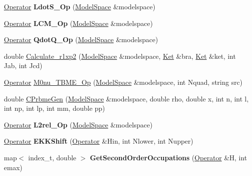 \begin{DoxyCompactItemize}
\item 
\mbox{\label{namespaceimsrg__util_a59effadf5bb5af39763fc2ba051d8f28}} 
\hyperlink{classOperator}{Operator} {\bfseries Ldot\+S\+\_\+\+Op} (\hyperlink{classModelSpace}{Model\+Space} \&modelspace)
\item 
\mbox{\label{namespaceimsrg__util_aa986d7b77ef7dc02fb620307bafc901c}} 
\hyperlink{classOperator}{Operator} {\bfseries L\+C\+M\+\_\+\+Op} (\hyperlink{classModelSpace}{Model\+Space} \&modelspace)
\item 
\mbox{\label{namespaceimsrg__util_a69a1c594ea2a97f14ffa971212f0e517}} 
\hyperlink{classOperator}{Operator} {\bfseries Qdot\+Q\+\_\+\+Op} (\hyperlink{classModelSpace}{Model\+Space} \&modelspace)
\item 
double \hyperlink{namespaceimsrg__util_aa28f0db9ecf5d7a27908cda9fa579a31}{Calculate\+\_\+r1xp2} (\hyperlink{classModelSpace}{Model\+Space} \&modelspace, \hyperlink{classKet}{Ket} \&bra, \hyperlink{classKet}{Ket} \&ket, int Jab, int Jcd)
\item 
\hyperlink{classOperator}{Operator} \hyperlink{namespaceimsrg__util_ab286571384270b07d5b002c8c6f6dca2}{M0nu\+\_\+\+T\+B\+M\+E\+\_\+\+Op} (\hyperlink{classModelSpace}{Model\+Space} \&modelspace, int Nquad, string src)
\item 
double \hyperlink{namespaceimsrg__util_a9e2f7d969020b57db388ecb464314ebb}{C\+Prbme\+Gen} (\hyperlink{classModelSpace}{Model\+Space} \&modelspace, double rho, double x, int n, int l, int np, int lp, int mm, double pp)
\item 
\mbox{\label{namespaceimsrg__util_a5e4f0da05037fbdbb7417248cbe3398e}} 
\hyperlink{classOperator}{Operator} {\bfseries L2rel\+\_\+\+Op} (\hyperlink{classModelSpace}{Model\+Space} \&modelspace)
\item 
\mbox{\label{namespaceimsrg__util_a51ea2e1b73104c29f16a7ad606c7cb24}} 
\hyperlink{classOperator}{Operator} {\bfseries E\+K\+K\+Shift} (\hyperlink{classOperator}{Operator} \&Hin, int Nlower, int Nupper)
\item 
\mbox{\label{namespaceimsrg__util_afd759ab1c852c361f391feb5f84479c9}} 
map$<$ index\+\_\+t, double $>$ {\bfseries Get\+Second\+Order\+Occupations} (\hyperlink{classOperator}{Operator} \&H, int emax)

\end{DoxyCompactItemize}
